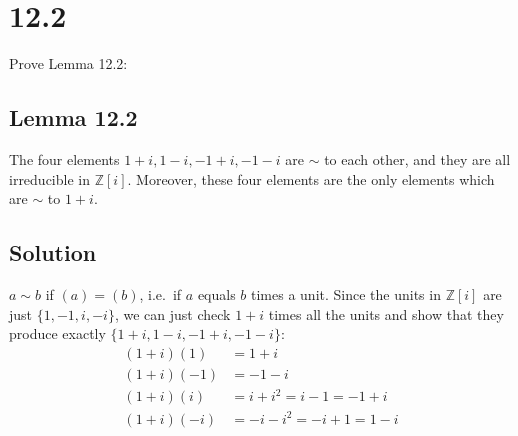 \documentclass[fleqn]{article}
\begin{document}
    \section{12.2}
    Prove Lemma 12.2:
        
        \subsection{Lemma 12.2}
        The four elements $1 + i, 1 - i, -1 + i, -1 - i$ are $\sim$ to each other, and they are all irreducible in $\mathbb{Z}[i]$.  Moreover, these four elements are the only elements which are $\sim$ to $1 + i$.
        
        \subsection{Solution}
        $a \sim b$ if $(a) = (b)$, i.e.\ if $a$ equals $b$ times a unit.  Since the units in $\mathbb{Z}[i]$ are just $\{1, -1, i, -i\}$, we can just check $1 + i$ times all the units and show that they produce exactly $\{1 + i, 1 - i, -1 + i, -1 - i\}$:
        \begin{align}
            (1 + i) (1) &= 1 + i \\
            (1 + i) (-1) &= -1 - i \\
            (1 + i) (i) &= i + i^2 = i - 1 = -1 + i \\
            (1 + i) (-i) &= -i - i^2 = -i + 1 = 1 - i
        \end{align}
\end{document}
